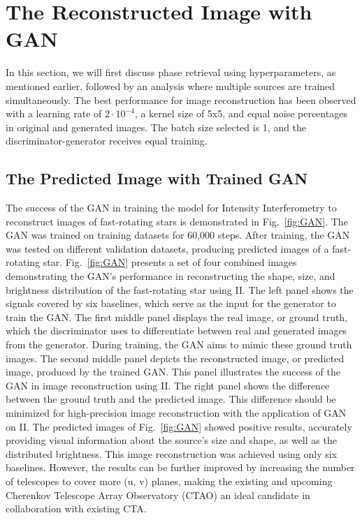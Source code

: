 \section{The Reconstructed Image with GAN}
In this section, we will first discuss phase retrieval using hyperparameters, as mentioned earlier, followed by an analysis where multiple sources are trained simultaneously. The best performance for image reconstruction has been observed with a learning rate of $2 \cdot 10^{-4}$, a kernel size of 5x5, and equal noise percentages in original and generated images. The batch size selected is 1, and the discriminator-generator receives equal training.
\subsection{The Predicted Image with Trained GAN}
The success of the GAN in training the model for Intensity Interferometry to reconstruct images of fast-rotating stars is demonstrated in Fig.~\ref{fig:GAN}. The GAN was trained on training datasets for 60,000 steps. After training, the GAN was tested on different validation datasets, producing predicted images of a fast-rotating star. Fig.~\ref{fig:GAN} presents a set of four combined images demonstrating the GAN's performance in reconstructing the shape, size, and brightness distribution of the fast-rotating star using II. The left panel shows the signals covered by six baselines, which serve as the input for the generator to train the GAN. The first middle panel displays the real image, or ground truth, which the discriminator uses to differentiate between real and generated images from the generator. During training, the GAN aims to mimic these ground truth images. The second middle panel depicts the reconstructed image, or predicted image, produced by the trained GAN. This panel illustrates the success of the GAN in image reconstruction using II. The right panel shows the difference between the ground truth and the predicted image. This difference should be minimized for high-precision image reconstruction with the application of GAN on II. The predicted images of Fig.~\ref{fig:GAN} showed positive results, accurately providing visual information about the source's size and shape, as well as the distributed brightness. This image reconstruction was achieved using only six baselines. However, the results can be further improved by increasing the number of telescopes to cover more (u, v) planes, making the existing and upcoming Cherenkov Telescope Array Observatory (CTAO) an ideal candidate in collaboration with existing CTA. 
